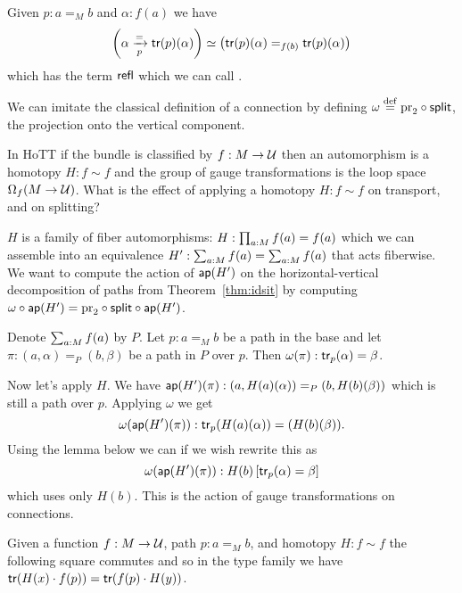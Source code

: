 \begin{mydef}
Given \( p:a=_M b \) and \( \alpha:f(a) \) we have 
\[
\left(\alpha\xrightarrow[{p}]{=}\mathsf{tr}(p)(\alpha)\right)\simeq \left(\mathsf{tr}(p)(\alpha)=_{f(b)}\mathsf{tr}(p)(\alpha)\right)
\]
which has the term \( \mathsf{refl} \) which we can call .
\end{mydef}

 We can imitate the classical definition of a connection by defining \( \omega\stackrel{\mathrm{def}}{=} \mathrm{pr}_2\circ\mathsf{split} \), the projection onto the vertical component.

In HoTT if the bundle is classified by \( f:M\to \mathcal{U} \) then an automorphism is a homotopy \( H:f\sim f \) and the group of gauge transformations is the loop space \( \Omega_f(M\to \mathcal{U}) \). What is the effect of applying a homotopy \( H:f\sim f \) on transport, and on splitting?

\( H \) is a family of fiber automorphisms: \( H:\prod_{a:M}f(a)=f(a) \) which we can assemble into an equivalence \( H':\sum_{a:M}f(a)=\sum_{a:M}f(a) \) that acts fiberwise. We want to compute the action of \( \mathsf{ap}(H') \) on the horizontal-vertical decomposition of paths from Theorem~\ref{thm:idsit} by computing \( \omega\circ\mathsf{ap}(H')=\mathrm{pr}_2\circ\mathsf{split}\circ\mathsf{ap}(H') \).

Denote \( \sum_{a:M}f(a) \) by \( P \). Let \( p:a=_M b \) be a path in the base and let \( \pi:(a,\alpha)=_P (b,\beta) \) be a path in \( P \) over \( p \). Then \( \omega(\pi):\mathsf{tr}_p(\alpha)=\beta \).

Now let's apply \( H \). We have \( \mathsf{ap}(H')(\pi):(a,H(a)(\alpha))=_P(b,H(b)(\beta)) \) which is still a path over \( p \). Applying \( \omega \) we get \[ \omega(\mathsf{ap}(H')(\pi)):\mathsf{tr}_p(H(a)(\alpha))=(H(b)(\beta)). \] Using the lemma below we can if we wish rewrite this as 
\[ 
\omega(\mathsf{ap}(H')(\pi)):H(b)\left[\mathsf{tr}_p(\alpha)=\beta\right]
\]
which uses only \( H(b) \). This is the action of gauge transformations on connections.

\begin{mylemma}
Given a function \( f:M\to\mathcal{U} \), path \( p:a=_M b \), and homotopy \( H:f\sim f \) the following square commutes and so in the type family we have \( \mathsf{tr}(H(x)\cdot f(p)) = \mathsf{tr}(f(p)\cdot H(y)) \).
\end{mylemma}
\begin{center}
\end{center}

